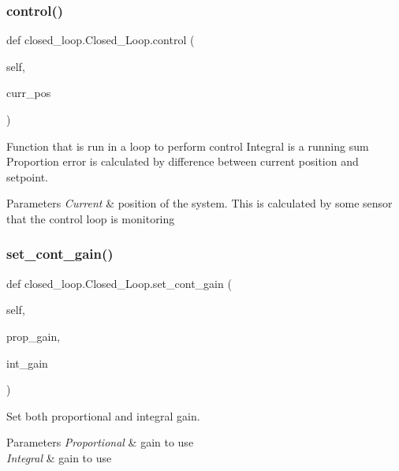 \subsubsection{\texorpdfstring{control()}{control()}}
{\footnotesize\ttfamily def closed\+\_\+loop.\+Closed\+\_\+\+Loop.\+control (\begin{DoxyParamCaption}\item[{}]{self,  }\item[{}]{curr\+\_\+pos }\end{DoxyParamCaption})}



Function that is run in a loop to perform control Integral is a running sum Proportion error is calculated by difference between current position and setpoint. 


\begin{DoxyParams}{Parameters}
{\em Current} & position of the system. This is calculated by some sensor that the control loop is monitoring \\
\hline
\end{DoxyParams}
\mbox{\label{classclosed__loop_1_1_closed___loop_af47dbd741bdc69255ebc85bc2e425be1}} 
\subsubsection{\texorpdfstring{set\_cont\_gain()}{set\_cont\_gain()}}
{\footnotesize\ttfamily def closed\+\_\+loop.\+Closed\+\_\+\+Loop.\+set\+\_\+cont\+\_\+gain (\begin{DoxyParamCaption}\item[{}]{self,  }\item[{}]{prop\+\_\+gain,  }\item[{}]{int\+\_\+gain }\end{DoxyParamCaption})}



Set both proportional and integral gain. 


\begin{DoxyParams}{Parameters}
{\em Proportional} & gain to use \\
\hline
{\em Integral} & gain to use \\
\hline
\end{DoxyParams}
\mbox{\label{classclosed__loop_1_1_closed___loop_a06332805a3fba3aee9bacc2843840ae7}} 
